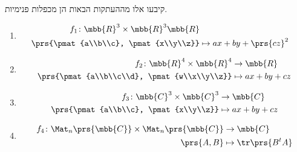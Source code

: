 \documentclass[a4paper,10pt,twoside,openany]{book}
\begin{document}
\begin{exercisechap}
קיבעו אלו מההעתקות הבאות הן מכפלות פנימיות.

\begin{enumerate}
\item
\begin{align*}
f_1 \colon \mbb{R}^3 \times \mbb{R}^3 \mbb{R} \\
\prs{\pmat{a\\b\\c}, \pmat{x\\y\\z}} &\mapsto ax + by + \prs{cz}^2
\end{align*}

\item
\begin{align*}
f_2 \colon \mbb{R}^4 \times \mbb{R}^4 &\to \mbb{R} \\
\prs{\pmat{a\\b\\c\\d}, \pmat{w\\x\\y\\z}} &\mapsto ax + by + cz 
\end{align*}

\item
\begin{align*}
f_3 \colon \mbb{C}^3 \times \mbb{C}^3 &\to \mbb{C} \\
\prs{\pmat{a\\b\\c}, \pmat{x\\y\\z}} &\mapsto ax + by + cz
\end{align*}

\item
\begin{align*}
f_4 \colon \Mat_n\prs{\mbb{C}} \times \Mat_n\prs{\mbb{C}} &\to \mbb{C} \\
\prs{A,B} &\mapsto \tr\prs{B^t A}
\end{align*}
\end{enumerate}
\end{exercisechap}
\end{document}
